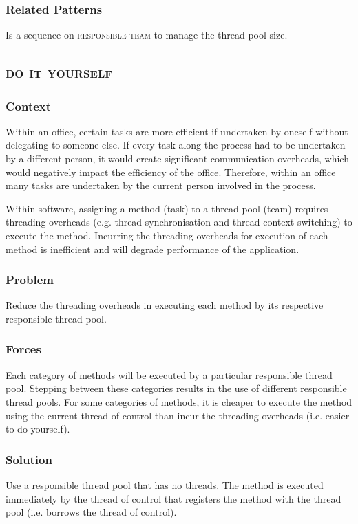 \documentclass[prodmode]{style/acmlarge}
\begin{document}
\subsubsection*{Related Patterns} Is a sequence on \textsc{responsible team} to
manage the thread pool size.



\subsection{\textsc{\textbf{do it yourself}}}

\subsubsection*{Context} Within an office, certain tasks are more efficient if
undertaken by oneself without delegating to someone else.  If every task along
the process had to be undertaken by a different person, it would create
significant communication overheads, which would negatively impact the
efficiency of the office.  Therefore, within an office many tasks are undertaken
by the current person involved in the process.

Within software, assigning a method (task) to a thread pool (team) requires
threading overheads (e.g. thread synchronisation and thread-context switching)
to execute the method.  Incurring the threading overheads for execution of each
method is inefficient and will degrade performance of the application.

\subsubsection*{\textbf{Problem}} Reduce the threading overheads in executing
each method by its respective responsible thread pool.

\subsubsection*{Forces} Each category of methods will be executed by a
particular responsible thread pool.  Stepping between these categories results
in the use of different responsible thread pools.  For some categories of
methods, it is cheaper to execute the method using the current thread of control
than incur the threading overheads (i.e. easier to do yourself).

\subsubsection*{\textbf{Solution}} Use a responsible thread pool that has no threads.
The method is executed immediately by the thread of control that registers the
method with the thread pool (i.e. borrows the thread of control).
\end{document}
